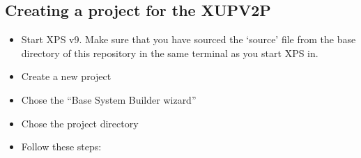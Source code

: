\documentclass[a4paper,oneside]{memoir}
\begin{document}


\subsection{Creating a project for the XUPV2P}\label{sec:creating_proj}

\begin{itemize}
\item Start XPS v9. Make sure that you have sourced the `source' file from the base directory of this repository in the same terminal as you start XPS in.
\item    Create a new project
\item    Chose the ``Base System Builder wizard''
\item    Chose the project directory
\item    Follow these steps:
\end{itemize}
\end{document}
